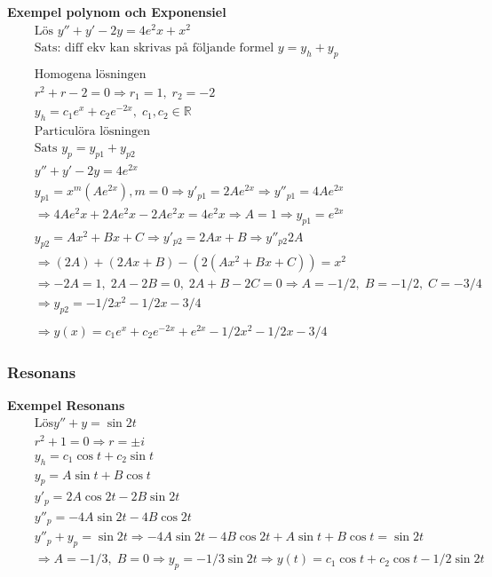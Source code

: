 \documentclass{article}
\begin{document}
\textbf{Exempel polynom och Exponensiel}
\begin{align*} %
  &\quad  \text{Lös }  y'' + y' -2y = 4e^2x + x^2 \\
  &\quad  \text{Sats: diff ekv kan skrivas på följande formel } y=y_h+y_p \\
  &\quad  \\
  &\quad  \text{Homogena lösningen } \\
  &\quad  r^2+r-2=0 \Rightarrow r_1=1, \; r_2=-2 \\
  &\quad  y_h=c_1e^x+c_2e^{-2x}, \; c_1,c_2\in\mathbb{R} \\
  &\quad  \text{Particulöra lösningen } \\
  &\quad  \text{Sats } y_p = y_{p1} + y_{p2} \\
  &\quad  y''+y'-2y=4e^{2x} \\
  &\quad  y_{p1}=x^m(Ae^{2x}), m=0 \Rightarrow  y'_{p1} = 2Ae^{2x} \Rightarrow  y''_{p1} = 4Ae^{2x} \\
  &\quad  \Rightarrow 4Ae^2x+2Ae^2x-2Ae^2x=4e^2x \Rightarrow A=1 \Rightarrow y_{p1}=e^{2x} \\
  &\quad  y_{p2} =  Ax^2+Bx+C \Rightarrow y'_{p2}=2Ax+B \Rightarrow y''_{p2}2A \\
  &\quad  \Rightarrow (2A) + (2Ax+B) - (2(Ax^2+Bx+C)) = x^2 \\
  &\quad  \Rightarrow -2A=1, \; 2A-2B=0, \; 2A+B-2C=0
  \Rightarrow A=-1/2, \; B=-1/2, \; C=-3/4 \\
  &\quad  \Rightarrow y_{p2}=-1/2x^2-1/2x-3/4 \\
  &\quad  \\
  &\quad  \Rightarrow y(x)=c_1e^x+c_2e^{-2x}+e^{2x}-1/2x^2-1/2x-3/4
\end{align*}


\newpage


\subsubsection{Resonans}
\textbf{Exempel Resonans}
\begin{align*}
  &\quad  \text{Lös} y''+y=\sin{2t} \\
  &\quad  r^2 +1 = 0 \Rightarrow r=\pm i \\
  &\quad  y_h=c_1\cos{t}+c_2\sin{t} \\
  &\quad  y_p=A\sin{t}+B\cos{t} \\
  &\quad  y'_p=2A\cos{2t}-2B\sin{2t} \\
  &\quad  y''_p=-4A\sin{2t}-4B\cos{2t} \\
  &\quad  y''_p + y_p = \sin{2t} \Rightarrow -4A\sin{2t}-4B\cos{2t} +  A\sin{t}+B\cos{t} = \sin{2t} \\
  &\quad  \Rightarrow A=-1/3, \; B=0 \Rightarrow y_p =-1/3\sin{2t} \Rightarrow
  y(t) = c_1\cos{t} + c_2\cos{t} -1/2\sin{2t} \\
\end{align*}
\end{document}
